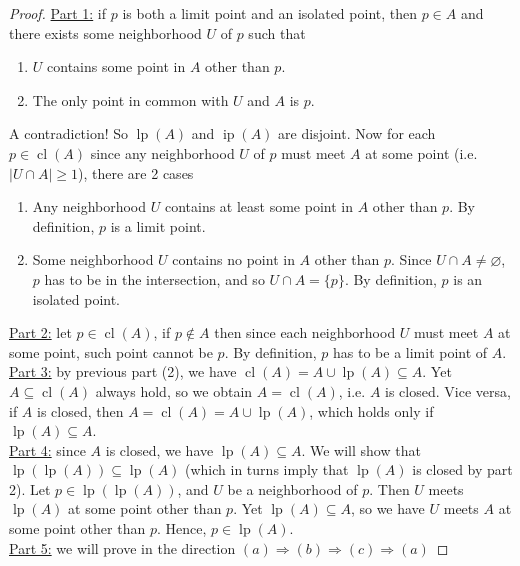 \documentclass{treatise}
\begin{document}
\begin{proof}
\underline{Part 1:} if $p$ is both a limit point and an isolated point, then $p \in A$ and there exists some neighborhood $U$ of $p$ such that
\begin{enumerate}
    \item $U$ contains some point in $A$ other than $p$.
    \item The only point in common with $U$ and $A$ is $p$.
\end{enumerate}
A contradiction! So $\operatorname{lp}(A)$ and $\operatorname{ip}(A)$ are disjoint. Now for each $p \in \operatorname{cl}(A)$ since any neighborhood $U$ of $p$ must meet $A$ at some point (i.e. $|U \cap A| \geq 1$), there are 2 cases
\begin{enumerate}
    \item Any neighborhood $U$ contains at least some point in $A$ other than $p$. By definition, $p$ is a limit point.
    \item Some neighborhood $U$ contains no point in $A$ other than $p$. Since $U \cap A \neq \varnothing$, $p$ has to be in the intersection, and so $U \cap A = \{ p \}$. By definition, $p$ is an isolated point.
\end{enumerate}
\underline{Part 2:} let $p \in \operatorname{cl}(A)$, if $p \notin A$ then since each neighborhood $U$ must meet $A$ at some point, such point cannot be $p$. By definition, $p$ has to be a limit point of $A$.
\\
\underline{Part 3:} by previous part (2), we have $\operatorname{cl}(A) = A \cup \operatorname{lp}(A) \subseteq A$. Yet $A \subseteq \operatorname{cl}(A)$ always hold, so we obtain $A = \operatorname{cl}(A)$, i.e. $A$ is closed. Vice versa, if $A$ is closed, then $A = \operatorname{cl}(A) = A \cup \operatorname{lp}(A)$, which holds only if $\operatorname{lp}(A) \subseteq A$.
\\
\underline{Part 4:} since $A$ is closed, we have $\operatorname{lp}(A) \subseteq A$. We will show that $\operatorname{lp}(\operatorname{lp}(A)) \subseteq \operatorname{lp}(A)$ (which in turns imply that $\operatorname{lp}(A)$ is closed by part 2). Let $p \in \operatorname{lp}(\operatorname{lp}(A))$, and $U$ be a neighborhood of $p$. Then $U$ meets $\operatorname{lp}(A)$ at some point other than $p$. Yet $\operatorname{lp}(A) \subseteq A$, so we have $U$ meets $A$ at some point other than $p$. Hence, $p \in \operatorname{lp}(A)$.
\\
\underline{Part 5:} we will prove in the direction $(a) \Rightarrow (b) \Rightarrow (c) \Rightarrow (a)$

\end{proof}
\end{document}
